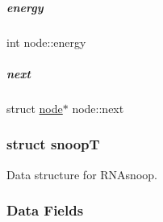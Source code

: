 \mbox{\label{group__data__structures_a9ac761dfb5511f78b2a921abc4eb6f44}} 
\subparagraph{\texorpdfstring{energy}{energy}}
{\footnotesize\ttfamily int node\+::energy}

\mbox{\label{group__data__structures_aa3e8aa83f864292b5a01210f4453fcc0}} 
\subparagraph{\texorpdfstring{next}{next}}
{\footnotesize\ttfamily struct \mbox{\hyperlink{group__data__structures_structnode}{node}}$\ast$ node\+::next}

\label{structsnoop_t}
\subsubsection{struct snoopT}
Data structure for R\+N\+Asnoop. \subsubsection*{Data Fields}
